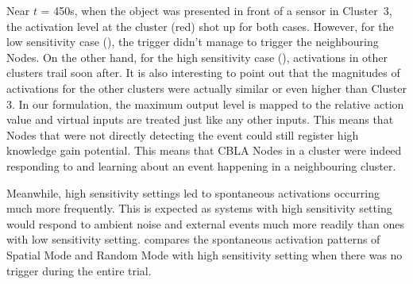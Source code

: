 Near $t$ = 450s, when the object was presented in front of a sensor in Cluster~3, the activation level at the cluster (red) shot up for both cases. However, for the low sensitivity case (), the trigger didn't manage to trigger the neighbouring Nodes. On the other hand, for the high sensitivity case (), activations in other clusters trail soon after. It is also interesting to point out that the magnitudes of activations for the other clusters were actually similar or even higher than Cluster 3. In our formulation, the maximum output level is mapped to the relative action value and virtual inputs are treated just like any other inputs. This means that Nodes that were not directly detecting the event could still register high knowledge gain potential. This means that CBLA Nodes in a cluster were indeed responding to and learning about an event happening in a neighbouring cluster.


Meanwhile, high sensitivity settings led to spontaneous activations occurring much more frequently. This is expected as systems with high sensitivity setting would respond to ambient noise and external events much more readily than ones with low sensitivity setting.  compares the spontaneous activation patterns of Spatial Mode and Random Mode with high sensitivity setting when there was no trigger during the entire trial. 


